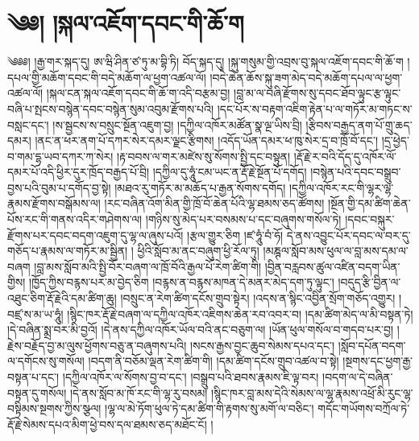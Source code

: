 \chapter{༄༅། །སྐལ་འཇོག་དབང་གི་ཆོ་ག}༄༅༅། །རྒྱ་གར་སྐད་དུ། ཨ་ཝི་ཤིན་ཙ་ཏུ་མ་བྷི་ཏི། བོད་སྐད་དུ། །སྐུ་གསུམ་གྱི་འབྲས་བུ་སྐལ་འཇོག་དབང་གི་ཆོ་ག །དཔལ་གྱི་མཆོག་དབང་གི་བདེ་མཆོག་ལ་ཕྱག་འཚལ་ལོ། །བདེ་ཆེན་ཆོས་སྐུ་ཟག་མེད་བདེ་མཆོག་དཔལ་ལ་ཕྱག་འཚལ་ལོ། །སྐལ་ངན་སྐལ་འཇོག་དབང་གི་ཆོ་ག་འདི་བརྩམ་བྱ། །བླ་མ་ལ་བཞི་རྫོགས་སུ་དབང་ཐོབ་ལྟུང་རྩ་ལྟུང་བཞི་པ་སྤངས་བསྙེན་དབང་བསྙེན་སུམ་འབུམ་རྫོགས་པའི། །དང་པོར་ས་བརྟག་འཇིག་རྟེན་པ་ལ་གཏོར་མ་གཏང་ས་བསླང་དང་། །ས་སྦྱངས་ས་བསྲུང་སྔོན་འཇུག་བྱ། །དཀྱིལ་འཁོར་མཚོན་སྣ་ལྔ་ཡིས་བྲི། །རྩིབས་བརྒྱད་ནག་པོ་གྲུ་ཆད་དམར། །ནང་ན་ཕར་ནག་པོ་དཀར་སེར་དམར་ལྗང་རྩིགས། །འདོད་ཡོན་དམར་ཕ་ཁུ་སེར་དྲ་བ་ཁྲོ་བོ་དང་། །དྲ་ཕྱེད་བ་གམ་དྷ་ཡབ་དཀར་ཀ་སེར། །རྟ་བབས་ལ་གར་མཛེས་སུ་སོགས་སྤྱི་དང་བསྟུན། །རྡོ་རྗེ་ར་བའི་དོད་དུ་འཁོར་ལོ་དམར་པོ་འདི་ཕྱིར་དུར་ཁྲོད་བརྒྱད་པོ་བྲི། །དཀྱིལ་དུ་ཧཱུཾ་ངམ་ཡང་ན་རྡོ་རྗེ་སྔོན་པོ་དགོད། །བསྙེན་པའི་དབང་བསྒྲུབ་བྱས་པའི་བུམ་པ་དགོད་བྱ་སྟེ། །མཐའ་རུ་གཏོར་མ་མཆོད་པ་རྒྱན་སོགས་དགོད། །དཀྱིལ་འཁོར་རང་གི་ལྷར་ལྷ་རྣམས་རྫོགས་བསྒོམས་ལ། །རང་བཞིན་འོག་མིན་གྱི་ཁྲོ་བོ་ཆེན་པོའི་ལྷ་ཐམས་ཅད་ཚོགས། །སྔོན་གྱི་དམ་ཚིག་ཆེན་པོས་རང་གི་གནས་འདིར་གཤེགས་ལ། །གཉིས་སུ་མེད་པར་བསམས་པ་དང་བཞུགས་གསོལ་ཏེ། །དབང་བསྐུར་རྫོགས་པར་དབང་བདག་འཇུག་དུ་ལྷ་ལ་ཞུས་པའོ། །རྩལ་གྱུར་ཅིག །ཛ་ཧཱུཾ་བཾ་ཧོ། དེ་ནས་འབྱུང་པོར་དབང་ལ་བར་དུ་གཅོད་པ་རྣམས་ལ་གཏོར་མ་སྦྱིན། ། ཕྱིའི་སློབ་མ་ནང་བཞུག་ཕྱི་རོལ་ཏུ། །མཎྚལ་སློབ་མས་ཕུལ་ལ་བླ་མས་དམ་ལ་བཞག །བླ་མས་སློབ་མའི་སྤྱི་བོར་བཞག་ལ་ཁྲོ་བོའི་རྒྱལ་པོ་རེག་ཚིག་གི། །བྱིན་བརླབས་ཚུལ་འཛིན་བདག་ཡིན་གྱིས། །ཁྱོད་ཀྱིས་བརྙས་པར་མ་བྱེད་ཅིག །བརྙས་ན་བརྙས་མཁན་དེ་མནར་མེད་དག་ཏུ་ལྟུང་། །བདུད་རྩི་བྱིན་ལ་འཐུང་ཅིག་རྡོ་རྗེའི་དམ་ཚིག་ཆུ། །བསྲུང་ན་རེག་ཚིག་དངོས་གྲུབ་སྟེར། །འདས་ན་སྙིང་འབྱིན་སྲོག་གཅོད་འགྱུར། །བཛྲ་ས་མ་ཡ་ཧཱུཾ། །སྙིང་ཁར་རྡོ་རྗེ་བཞག་ལ་དཀྱིལ་འཁོར་འཇིགས་ཆེན་རབ་འབར་བ། །དམ་ཚིག་མེད་ལ་མི་བསྟན་ཏེ། །དེ་བཞིན་སྨྲ་བར་མི་བྱའོ། །དེ་ནས་དཀྱིལ་འཁོར་ཡོལ་བའི་ནང་བཅུག་ལ། །ཡོན་ཕུལ་གསོལ་བ་གདབ་པར་བྱ། །རྗེས་བརྗོད་བྱ་མ་ལུས་ཕྱོགས་བཅུ་ན་བཞུགས་པའི། །སངས་རྒྱས་བྱང་ཆུབ་སེམས་དཔའ་དང་། །སློབ་དཔོན་བདག་ལ་དགོངས་སུ་གསོལ། །བདག་ནི་བཅོམ་ལྡན་རེག་ཚིག་གི། །དམ་ཚིག་དངོས་གྲུབ་འཚལ་བ་སྟེ། །སྔགས་དང་ཕྱག་རྒྱ་བསྟན་པ་དང་། །དཀྱིལ་འཁོར་ལ་སོགས་བྱ་བ་དང་། །བསྒྲུབ་པའི་ཐབས་རྣམས་ཇི་ལྟ་བར། །བདག་ལ་དེ་བཞིན་བསྟན་དུ་གསོལ། །དེ་ནས་སློབ་མ་ཁོ་རང་གི་ལྷ་རུ་བསམ། །སྙིང་ཁར་བླ་མས་དེའི་སེམས་ལ་ལྷ་རྣམས་འཕྲོ་མི་རུང་ལྷ་བསྟིམས་སྔགས་ཀྱིས་སྩལ། །ལྷ་ལ་མེ་ཏོག་ཕུལ་ཏེ་དམ་ཚིག་གི་རྟགས་སུ་མགོ་ལ་བཅིང་། གདོང་གཡོགས་བཀྲོལ་ཏེ་རྡོ་རྗེ་སེམས་དཔའ་མིག་ཕྱེ་བས་དལ་ཐམས་ཅད་མཐོང་ངོ། །
